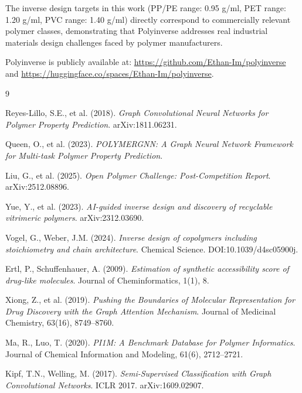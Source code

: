 \documentclass{article}
\begin{document}
The inverse design targets in this work (PP/PE range: 0.95 g/ml, 
PET range: 1.20 g/ml, PVC range: 1.40 g/ml) directly correspond to 
commercially relevant polymer classes, demonstrating that Polyinverse 
addresses real industrial materials design challenges faced by polymer 
manufacturers.

Polyinverse is publicly available at:
\url{https://github.com/Ethan-Im/polyinverse} and
\url{https://huggingface.co/spaces/Ethan-Im/polyinverse}.


\begin{thebibliography}{9}

Reyes-Lillo, S.E., et al. (2018).
\textit{Graph Convolutional Neural Networks for Polymer Property Prediction}.
arXiv:1811.06231.

Queen, O., et al. (2023).
\textit{POLYMERGNN: A Graph Neural Network Framework for Multi-task Polymer Property Prediction}.

Liu, G., et al. (2025).
\textit{Open Polymer Challenge: Post-Competition Report}.
arXiv:2512.08896.

Yue, Y., et al. (2023).
\textit{AI-guided inverse design and discovery of recyclable vitrimeric polymers}.
arXiv:2312.03690.

Vogel, G., Weber, J.M. (2024).
\textit{Inverse design of copolymers including stoichiometry and chain architecture}.
Chemical Science. DOI:10.1039/d4sc05900j.

Ertl, P., Schuffenhauer, A. (2009).
\textit{Estimation of synthetic accessibility score of drug-like molecules}.
Journal of Cheminformatics, 1(1), 8.

Xiong, Z., et al. (2019).
\textit{Pushing the Boundaries of Molecular Representation for Drug Discovery with the Graph Attention Mechanism}.
Journal of Medicinal Chemistry, 63(16), 8749--8760.

Ma, R., Luo, T. (2020).
\textit{PI1M: A Benchmark Database for Polymer Informatics}.
Journal of Chemical Information and Modeling, 61(6), 2712--2721.

Kipf, T.N., Welling, M. (2017).
\textit{Semi-Supervised Classification with Graph Convolutional Networks}.
ICLR 2017. arXiv:1609.02907.

\end{thebibliography}
\end{document}
